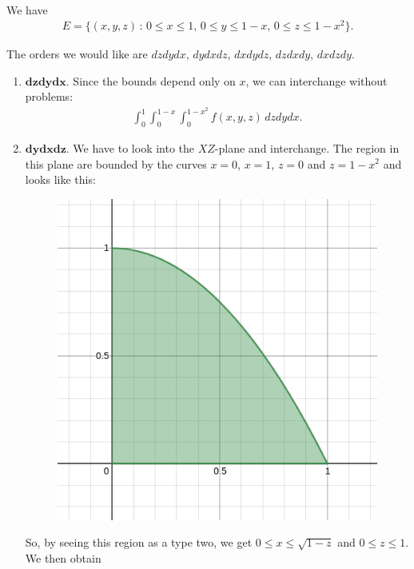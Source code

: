 	\spc 
	
	\\
	We have 
		\begin{align*}
		E = \{ (x, y, z) \, : \, 0 \leq x \leq 1 \text{, } 0 \leq y \leq 1 - x \text{, } 0 \leq z \leq 1 - x^2 \} .
		\end{align*}
		
	The orders we would like are $dz dy dx$, $dy dx dz$, $dx dy dz$, $dz dx dy$, $dx dz dy$.
	
	\begin{enumerate}
	\item $\mathbf{dzdydx}$. Since the bounds depend only on $x$, we can interchange without problems:
		\begin{align*}
		\int_0^1 \int_{0}^{1 - x} \int_0^{1 - x^2} f(x, y, z) \, dz dy dx .
		\end{align*}
	\item $\mathbf{dydxdz}$. We have to look into the $XZ$-plane and interchange. The region in this plane are bounded by the curves $x = 0$, $x = 1$, $z = 0$ and $z = 1-x^2$ and looks like this:
		\begin{figure}[h]
		\centering
		\includegraphics[scale=0.5]{problem64-dydxdz.png}
		\end{figure}
	So, by seeing this region as a type two, we get $0 \leq x \leq \sqrt{1 - z}$ and $0 \leq z \leq 1$. We then obtain
		\begin{align*}

\end{align*}
\end{enumerate}
